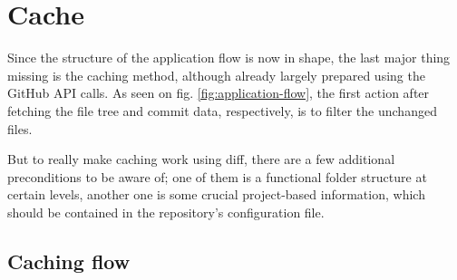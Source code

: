 \section{Cache}
\label{sec:implementation-cache}

Since the structure of the application flow is now in shape, the last major thing missing is the caching method, although already largely prepared using the GitHub API calls. As seen on fig. \ref{fig:application-flow}, the first action after fetching the file tree and commit data, respectively, is to filter the unchanged files.

But to really make caching work using diff, there are a few additional preconditions to be aware of; one of them is a functional folder structure at certain levels, another one is some crucial project-based information, which should be contained in the repository's configuration file.

\subsection{Caching flow}
